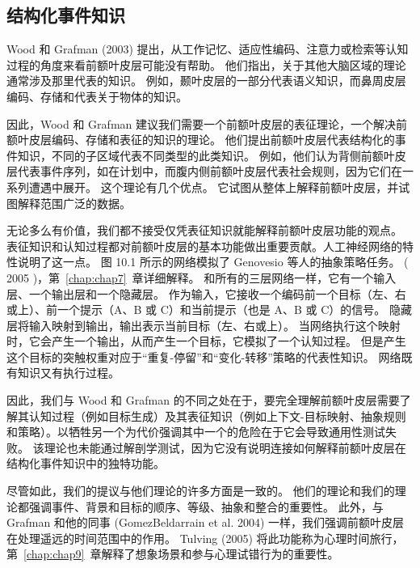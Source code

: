 \subsection{结构化事件知识}
Wood 和 Grafman (2003) 提出，从工作记忆、适应性编码、注意力或检索等认知过程的角度来看前额叶皮层可能没有帮助。 他们指出，关于其他大脑区域的理论通常涉及那里代表的知识。 例如，颞叶皮层的一部分代表语义知识，而鼻周皮层编码、存储和代表关于物体的知识。
\par 
因此，Wood 和 Grafman 建议我们需要一个前额叶皮层的表征理论，一个解决前额叶皮层编码、存储和表征的知识的理论。 他们提出前额叶皮层代表结构化的事件知识，不同的子区域代表不同类型的此类知识。 例如，他们认为背侧前额叶皮层代表事件序列，如在计划中，而腹内侧前额叶皮层代表社会规则，因为它们在一系列遭遇中展开。 这个理论有几个优点。 它试图从整体上解释前额叶皮层，并试图解释范围广泛的数据。
\par 
无论多么有价值，我们都不接受仅凭表征知识就能解释前额叶皮层功能的观点。 表征知识和认知过程都对前额叶皮层的基本功能做出重要贡献。人工神经网络的特性说明了这一点。 图 10.1 所示的网络模拟了 Genovesio 等人的抽象策略任务。 ( 2005 )，第~\ref{chap:chap7}~章详细解释。 和所有的三层网络一样，它有一个输入层、一个输出层和一个隐藏层。 作为输入，它接收一个编码前一个目标（左、右或上）、前一个提示（A、B 或 C）和当前提示（也是 A、B 或 C）的信号。 隐藏层将输入映射到输出，输出表示当前目标（左、右或上）。 当网络执行这个映射时，它会产生一个输出，从而产生一个目标，它模拟了一个认知过程。 但是产生这个目标的突触权重对应于“重复-停留”和“变化-转移”策略的代表性知识。 网络既有知识又有执行过程。
\par 
因此，我们与 Wood 和 Grafman 的不同之处在于，要完全理解前额叶皮层需要了解其认知过程（例如目标生成）及其表征知识（例如上下文-目标映射、抽象规则和策略）。以牺牲另一个为代价强调其中一个的危险在于它会导致通用性测试失败。 该理论也未能通过解剖学测试，因为它没有说明连接如何解释前额叶皮层在结构化事件知识中的独特功能。
\par 
尽管如此，我们的提议与他们理论的许多方面是一致的。 他们的理论和我们的理论都强调事件、背景和目标的顺序、等级、抽象和整合的重要性。 此外，与 Grafman 和他的同事 (GomezBeldarrain et al. 2004) 一样，我们强调前额叶皮层在处理遥远的时间范围中的作用。 Tulving (2005) 将此功能称为心理时间旅行，第~\ref{chap:chap9}~章解释了想象场景和参与心理试错行为的重要性。
